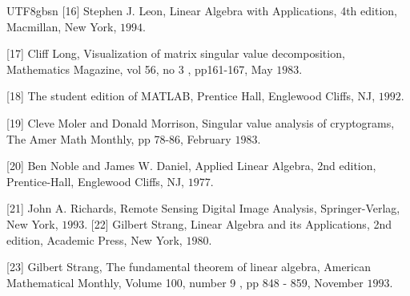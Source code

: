 \documentclass[11pt,a4paper,twoside]{article}
\begin{document}
\begin{CJK}{UTF8}{gbsn}
[16] Stephen J. Leon, Linear Algebra with Applications, 4th edition, Macmillan, New York, $1994 .$

[17] Cliff Long, Visualization of matrix singular value decomposition, Mathematics Magazine, vol 56, no 3 , pp161-167, May $1983 .$

[18] The student edition of MATLAB, Prentice Hall, Englewood Cliffs, NJ, $1992 .$

[19] Cleve Moler and Donald Morrison, Singular value analysis of cryptograms, The Amer Math Monthly, pp 78-86, February $1983 .$

[20] Ben Noble and James W. Daniel, Applied Linear Algebra, 2nd edition, Prentice-Hall, Englewood Cliffs, NJ, $1977 .$

[21] John A. Richards, Remote Sensing Digital Image Analysis, Springer-Verlag, New York, $1993 .$ [22] Gilbert Strang, Linear Algebra and its Applications, 2nd edition, Academic Press, New York, $1980 .$

[23] Gilbert Strang, The fundamental theorem of linear algebra, American Mathematical Monthly, Volume 100, number 9 , pp 848 - 859, November $1993 .$
\end{CJK}
\end{document}
